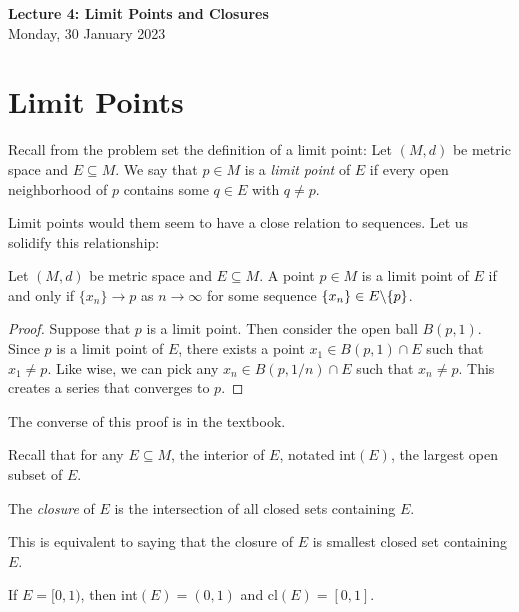 \documentclass[11pt]{article}
\theoremstyle{definition}
\newcommand{\bslash}{\symbol{92}}
\begin{document}
\thispagestyle{empty}

\begin{center}
{\LARGE \bf Lecture 4: Limit Points and Closures}\\
{\large Monday, 30 January 2023}\\

\end{center}

\section{Limit Points}
Recall from the problem set the definition of a limit point:
 Let $(M,d)$ be metric space and $E\subseteq M$. We say that $p\in M$ is a \textit{limit point} of $E$ if every open neighborhood of $p$ contains some $q\in E$ with $q\neq p$.

Limit points would them seem to have a close relation to sequences. Let us solidify this relationship:

\prop Let $(M,d)$ be metric space and $E\subseteq M$. A point $p\in M$ is a limit point of $E$ if and only if $\{x_n\}\to p$ as $n\to\infty$ for some sequence $\{x_n\}\in E\bslash\{p\}$.

\begin{proof}
    Suppose that $p$ is a limit point. Then consider the open ball $B(p,1)$. Since $p$ is a limit point of $E$, there exists a point $x_1\in B(p,1)\cap E$ such that $x_1\neq p$. Like wise, we can pick any $x_n\in B(p,1/n)\cap E$ such that $x_n\neq p$. This creates a series that converges to $p$.  
\end{proof}
The converse of this proof is in the textbook.

Recall that for any $E\subseteq M$, the interior of $E$, notated int$(E)$, the largest open subset of $E$. 

 The \textit{closure} of $E$ is the intersection of all closed sets containing $E$.

\note This is equivalent to saying that the closure of $E$ is smallest closed set containing $E$.

\ex If $E=[0,1)$, then int$(E)=(0,1)$ and cl$(E)=[0,1]$.
\end{document}
